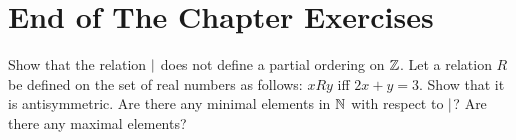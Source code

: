 \section*{End of The Chapter Exercises}
\begin{exercises}
  \exerciseitem Show that the relation $\mid$ does not define a partial
    ordering on $\mathbb{Z}$.
  \exerciseitem Let a relation $R$ be defined on the set of real numbers as
    follows: $x R y$ iff $2x + y = 3$. Show that it is antisymmetric.
  \exerciseitem Are there any minimal elements in $\mathbb{N}$ with respect to
    $\mid$? Are there any maximal elements?
\end{exercises}
